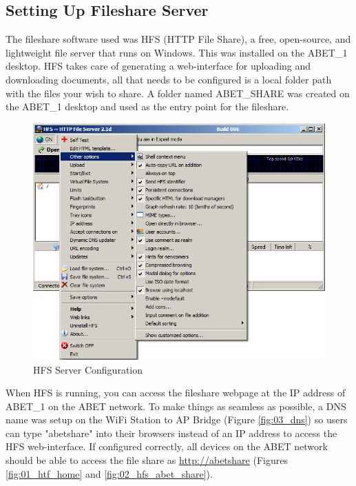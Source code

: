\documentclass{article}
\begin{document}
\subsection{Setting Up Fileshare Server}

The fileshare software used was HFS (HTTP File Share), a free, open-source, and
lightweight file server that runs on Windows. This was installed on the ABET\_1
desktop. HFS takes care of generating a web-interface for uploading and
downloading documents, all that needs to be configured is a local folder path
with the files your wish to share. A folder named ABET\_SHARE was created on the
ABET\_1 desktop and used as the entry point for the fileshare.

\begin{figure}[H]
  \centering
  \includegraphics[scale=0.30]{./img/hfs.png}
  \caption{HFS Server Configuration}
  \label{fig:hfs}
\end{figure}

When HFS is running, you can access the fileshare webpage at the IP address of
ABET\_1 on the ABET network. To make things as seamless as possible, a DNS name
was setup on the WiFi Station to AP Bridge (Figure \ref{fig:03_dns}) so users can
type "abetshare" into their browsers instead of an IP address to access the
HFS web-interface. If configured correctly, all devices on the ABET network
should be able to access the file share as \url{http://abetshare} (Figures
\ref{fig:01_htf_home} and \ref{fig:02_hfs_abet_share}).
\end{document}
